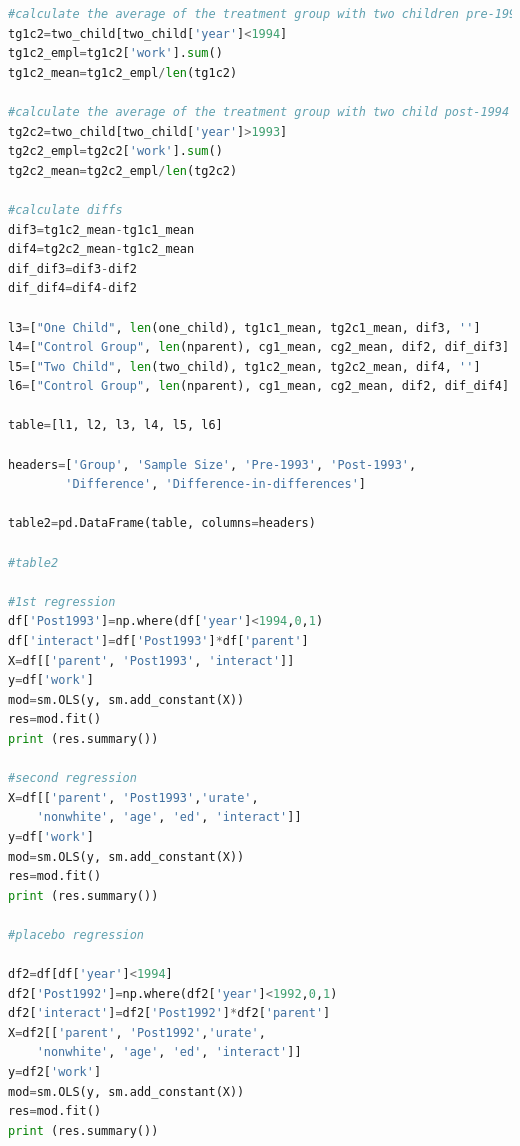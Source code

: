 \documentclass{article}
\begin{document}
\begin{lstlisting}[language=Python]
#calculate the average of the treatment group with two children pre-1994
tg1c2=two_child[two_child['year']<1994]
tg1c2_empl=tg1c2['work'].sum()
tg1c2_mean=tg1c2_empl/len(tg1c2)

#calculate the average of the treatment group with two child post-1994
tg2c2=two_child[two_child['year']>1993]
tg2c2_empl=tg2c2['work'].sum()
tg2c2_mean=tg2c2_empl/len(tg2c2)

#calculate diffs
dif3=tg1c2_mean-tg1c1_mean
dif4=tg2c2_mean-tg1c2_mean
dif_dif3=dif3-dif2
dif_dif4=dif4-dif2

l3=["One Child", len(one_child), tg1c1_mean, tg2c1_mean, dif3, '']
l4=["Control Group", len(nparent), cg1_mean, cg2_mean, dif2, dif_dif3]
l5=["Two Child", len(two_child), tg1c2_mean, tg2c2_mean, dif4, '']
l6=["Control Group", len(nparent), cg1_mean, cg2_mean, dif2, dif_dif4]

table=[l1, l2, l3, l4, l5, l6]

headers=['Group', 'Sample Size', 'Pre-1993', 'Post-1993', 
		'Difference', 'Difference-in-differences']

table2=pd.DataFrame(table, columns=headers)

#table2

#1st regression
df['Post1993']=np.where(df['year']<1994,0,1)
df['interact']=df['Post1993']*df['parent']
X=df[['parent', 'Post1993', 'interact']]
y=df['work']
mod=sm.OLS(y, sm.add_constant(X))
res=mod.fit()
print (res.summary())

#second regression
X=df[['parent', 'Post1993','urate', 
	'nonwhite', 'age', 'ed', 'interact']]
y=df['work']
mod=sm.OLS(y, sm.add_constant(X))
res=mod.fit()
print (res.summary())

#placebo regression

df2=df[df['year']<1994]
df2['Post1992']=np.where(df2['year']<1992,0,1)
df2['interact']=df2['Post1992']*df2['parent']
X=df2[['parent', 'Post1992','urate', 
	'nonwhite', 'age', 'ed', 'interact']]
y=df2['work']
mod=sm.OLS(y, sm.add_constant(X))
res=mod.fit()
print (res.summary())
\end{lstlisting}
\end{document}
